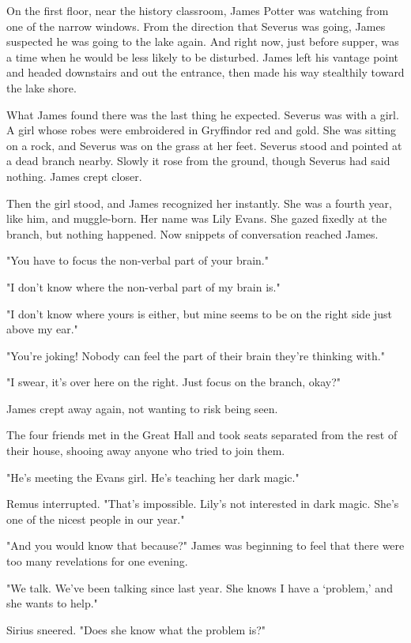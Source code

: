 On the first floor, near the history classroom, James Potter was watching from one of the narrow windows. From the direction that Severus was going, James suspected he was going to the lake again. And right now, just before supper, was a time when he would be less likely to be disturbed. James left his vantage point and headed downstairs and out the entrance, then made his way stealthily toward the lake shore.

What James found there was the last thing he expected. Severus was with a girl. A girl whose robes were embroidered in Gryffindor red and gold. She was sitting on a rock, and Severus was on the grass at her feet. Severus stood and pointed at a dead branch nearby. Slowly it rose from the ground, though Severus had said nothing. James crept closer.

Then the girl stood, and James recognized her instantly. She was a fourth year, like him, and muggle-born. Her name was Lily Evans. She gazed fixedly at the branch, but nothing happened. Now snippets of conversation reached James.

"You have to focus the non-verbal part of your brain."

"I don't know where the non-verbal part of my brain is."

"I don't know where yours is either, but mine seems to be on the right side just above my ear."

"You're joking! Nobody can feel the part of their brain they're thinking with."

"I swear, it's over here on the right. Just focus on the branch, okay?"

James crept away again, not wanting to risk being seen.

The four friends met in the Great Hall and took seats separated from the rest of their house, shooing away anyone who tried to join them.

"He's meeting the Evans girl. He's teaching her dark magic."

Remus interrupted. "That's impossible. Lily's not interested in dark magic. She's one of the nicest people in our year."

"And you would know that because{\el}?" James was beginning to feel that there were too many revelations for one evening.

"We talk. We've been talking since last year. She knows I have a `problem,' and she wants to help."

Sirius sneered. "Does she know what the problem is?"

